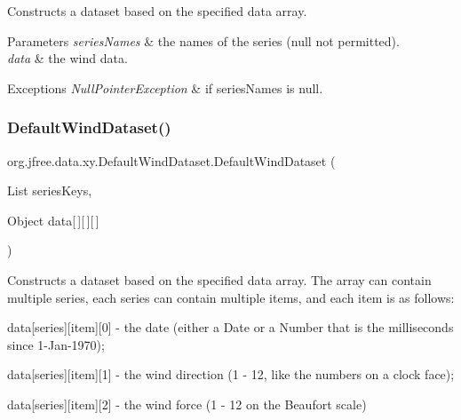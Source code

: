 Constructs a dataset based on the specified data array.


\begin{DoxyParams}{Parameters}
{\em series\+Names} & the names of the series ({\ttfamily null} not permitted). \\
\hline
{\em data} & the wind data.\\
\hline
\end{DoxyParams}

\begin{DoxyExceptions}{Exceptions}
{\em Null\+Pointer\+Exception} & if {\ttfamily series\+Names} is {\ttfamily null}. \\
\hline
\end{DoxyExceptions}
\mbox{\label{classorg_1_1jfree_1_1data_1_1xy_1_1_default_wind_dataset_acb6a3aca0dc3e10e3d79abc98e9b6f39}} 
\subsubsection{\texorpdfstring{Default\+Wind\+Dataset()}{DefaultWindDataset()}\hspace{0.1cm}{\footnotesize\ttfamily [4/4]}}
{\footnotesize\ttfamily org.\+jfree.\+data.\+xy.\+Default\+Wind\+Dataset.\+Default\+Wind\+Dataset (\begin{DoxyParamCaption}\item[{List}]{series\+Keys,  }\item[{Object}]{data\mbox{[}$\,$\mbox{]}\mbox{[}$\,$\mbox{]}\mbox{[}$\,$\mbox{]} }\end{DoxyParamCaption})}

Constructs a dataset based on the specified data array. The array can contain multiple series, each series can contain multiple items, and each item is as follows\+: 
\begin{DoxyItemize}
\item {\ttfamily data\mbox{[}series\mbox{]}\mbox{[}item\mbox{]}\mbox{[}0\mbox{]}} -\/ the date (either a {\ttfamily Date} or a {\ttfamily Number} that is the milliseconds since 1-\/\+Jan-\/1970); 
\item {\ttfamily data\mbox{[}series\mbox{]}\mbox{[}item\mbox{]}\mbox{[}1\mbox{]}} -\/ the wind direction (1 -\/ 12, like the numbers on a clock face); 
\item {\ttfamily data\mbox{[}series\mbox{]}\mbox{[}item\mbox{]}\mbox{[}2\mbox{]}} -\/ the wind force (1 -\/ 12 on the Beaufort scale) 
\end{DoxyItemize}


